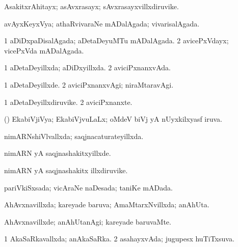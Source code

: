{{\bentry
{} 
\gl{\nA}
\expl{}
\bmng
AsakitxrAhitayx; asAvxrasayx; sAvxrasayxvillxdiruvike. 
\emng
\eentry

\bentry
{} 
\gl{\gu}
\expl{}
\bmng
avAyxKeyxVya; athaRvivaraNe mADalAgada; vivarisalAgada. 
\emng
\eentry

\bentry
{} 
\gl{\gu}
\expl{}
\bmng
\bnum
\num{1} aDiDxpaDisalAgada; aDetaDeyuMTu mADalAgada. 
\num{2} avicePxVdayx; vicePxVda mADalAgada. 
\enum
\emng
\eentry

\bentry
{} 
\gl{\gu}
\expl{}
\bmng
\bnum
\num{1} aDetaDeyillxda; aDiDxyillxda. 
\num{2} aviciPxnanxvAda. 
\enum
\emng
\eentry

\bentry
{} 
\gl{\kirxvi}
\expl{}
\bmng
\bnum
\num{1} aDetaDeyillxde. 
\num{2} aviciPxnanxvAgi; niraMtaravAgi. 
\enum
\emng
\eentry

\bentry
{} 
\gl{\nA}
\expl{}
\bmng
\bnum
\num{1} aDetaDeyillxdiruvike. 
\num{2} aviciPxnanxte. 
\enum
\emng
\eentry

\bentry
{} 
\gl{\gu}
\expl{}
\bmng
(\jiVvi) EkabiVjiVya; EkabiVjvuLaLx; oMdeV biVj yA nUyxkilxyasf iruva. 
\emng
\eentry

\bentry
{} 
\gl{\gu}
\expl{}
\bmng
nimARNshiVlvallxda; saqjnacaturateyillxda. 
\emng
\eentry

\bentry
{} 
\gl{\kirxvi}
\expl{}
\bmng
nimARN yA saqjnashakitxyillxde. 
\emng
\eentry

\bentry
{} 
\gl{\nA}
\expl{}
\bmng
nimARN yA saqjnashakitx illxdiruvike. 
\emng
\eentry

\bentry
{} 
\gl{\gu}
\expl{}
\bmng
pariVkiSxsada; vicAraNe naDesada; taniKe mADada. 
\emng
\eentry

\bentry
{} 
\gl{\gu}
\expl{}
\bmng
AhAvxnavillxda; kareyade baruva; AmaMtarxNvillxda; anAhUta. 
\emng
\eentry

\bentry
{} 
\gl{\kirxvi}
\expl{}
\bmng
AhAvxnavillxde; anAhUtanAgi; kareyade baruvaMte. 
\emng
\eentry

\bentry
{} 
\gl{\gu}
\expl{}
\bmng
\bnum
\num{1} AkaSaRkavallxda; anAkaSaRka. 
\num{2} asahayxvAda; jugupesx huTiTxsuva. 
\enum
\emng
\eentry

}}
